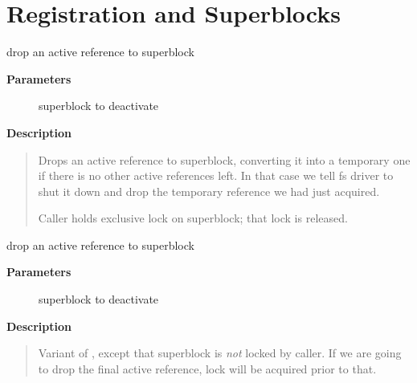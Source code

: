 \documentclass[a4paper,8pt,english]{sphinxmanual}
\begin{document}
\section{Registration and Superblocks}
\label{filesystems/index:registration-and-superblocks}

\begin{fulllineitems}
\label{filesystems/index:c.deactivate_locked_super}
drop an active reference to superblock

\end{fulllineitems}


\textbf{Parameters}
\begin{description}
\item[{}] \leavevmode
superblock to deactivate

\end{description}

\textbf{Description}
\begin{quote}

Drops an active reference to superblock, converting it into a temporary
one if there is no other active references left.  In that case we
tell fs driver to shut it down and drop the temporary reference we
had just acquired.

Caller holds exclusive lock on superblock; that lock is released.
\end{quote}

\begin{fulllineitems}
\label{filesystems/index:c.deactivate_super}
drop an active reference to superblock

\end{fulllineitems}


\textbf{Parameters}
\begin{description}
\item[{}] \leavevmode
superblock to deactivate

\end{description}

\textbf{Description}
\begin{quote}

Variant of {\hyperref[filesystems/index:c.deactivate_locked_super]{\emph{}}}, except that superblock is \emph{not}
locked by caller.  If we are going to drop the final active reference,
lock will be acquired prior to that.
\end{quote}
\end{document}
